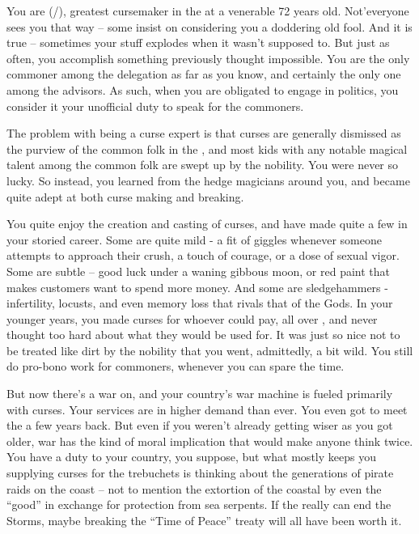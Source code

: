 \documentclass[char]{GL2020}
\begin{document}
\name{\cCurse{}}

You are \cCurse{\full} (\cCurse{\they}/\cCurse{\them}), greatest cursemaker in the \pFarm{} at a venerable 72 years old. Not'everyone sees you that way -- some insist on considering you a doddering old fool. And it is true -- sometimes your stuff explodes when it wasn't supposed to. But just as often, you accomplish something previously thought impossible. You are the only commoner among the \pFarm{} delegation as far as you know, and certainly the only one among the advisors. As such, when you are obligated to engage in politics, you consider it your unofficial duty to speak for the commoners.

The problem with being a curse expert is that curses are generally dismissed as the purview of the common folk in the \pFarm{}, and most kids with any notable magical talent among the common folk are swept up by the nobility. You were never so lucky. So instead, you learned from the hedge magicians around you, and became quite adept at both curse making and breaking. 

You quite enjoy the creation and casting of curses, and have made quite a few in your storied career. Some are quite mild - a fit of giggles whenever someone attempts to approach their crush, a touch of courage, or a dose of sexual vigor. Some are subtle -- good luck under a waning gibbous moon, or red paint that makes customers want to spend more money. And some are sledgehammers - infertility, locusts, and even memory loss that rivals that of the Gods. In your younger years, you made curses for whoever could pay, all over \pEarth{}, and never thought too hard about what they would be used for. It was just so nice not to be treated like dirt by the \pFarm{} nobility that you went, admittedly, a bit wild. You still do pro-bono work for commoners, whenever you can spare the time.

But now there's a war on, and your country's war machine is fueled primarily with curses. Your services are in higher demand than ever. You even got to meet the \cQueen{\Majesty} a few years back. But even if you weren't already getting wiser as you got older, war has the kind of moral implication that would make anyone think twice. You have a duty to your country, you suppose, but what mostly keeps you supplying curses for the trebuchets is thinking about the generations of pirate raids on the coast -- not to mention the extortion of the coastal \pFarm{} by even the ``good'' \pShippies{} in exchange for protection from sea serpents. If the \pTech{} really can end the Storms, maybe breaking the ``Time of Peace'' treaty will all have been worth it.
\end{document}
